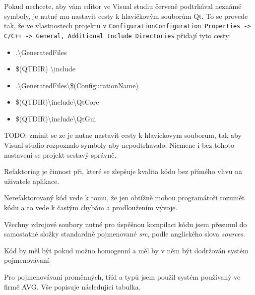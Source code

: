 Pokud nechcete, aby vám editor ve Visual studiu červeně podtrhával neznámé symboly, je nutné mu nastavit cesty k hlavičkovým souborům Qt. To se provede tak, že ve vlastnostech projektu v \texttt{ConfigurationConfiguration Properties -> C/C++ -> General, Additional Include Directories} přidají tyto cesty: 
\begin{itemize}
	\item .\textbackslash GeneratedFiles
	\item \$(QTDIR) \textbackslash include
	\item .\textbackslash GeneratedFiles\textbackslash\$(ConfigurationName)
	\item \$(QTDIR)\textbackslash include\textbackslash QtCore
	\item \$(QTDIR)\textbackslash include\textbackslash QtGui
\end{itemize}

TODO: zminit se ze je nutne nastavit cesty k hlavickovym souborum, tak aby Visual studio rozpoznalo symboly aby nepodtrhavalo. Nicmene i bez tohoto nastavení se projekt sestavý správně.




Refaktoring je činnost při, které se zlepšuje kvalita kódu bez přímého vlivu na uživatele aplikace.

Nerefaktorovaný kód vede k tomu, že jen obtížně mohou programátoři rozumět kódu a to vede k častým chybám a prodloužením vývoje.

Všechny zdrojové soubory nutné pro úspěšnou kompilaci kódu jsem přesunul do samostatné složky standardně pojmenované \textit{src}, podle anglického slova \textit{sources}.

Kód by měl být pokud možno homogenní a měl by v něm být dodržován systém pojmenovávaní. 


Pro pojmenovávaní proměnných, tříd a typů jsem použil systém používaný ve firmě AVG.
Vše popisuje následující tabulka.



